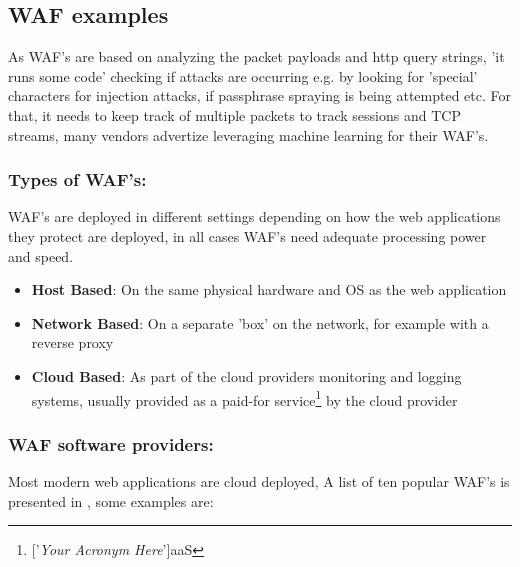 \documentclass[
	letterpaper, %
	10pt, %
	unnumberedsections, %
	twoside, %
]{APAAssignment}
\begin{document}
\subsection{WAF examples}
As WAF's are based on analyzing the packet payloads and http query strings, 'it runs some code' checking if attacks are occurring e.g. by looking for 'special' characters for injection attacks, if passphrase spraying is being attempted etc. For that, it needs to keep track of multiple packets to track sessions and TCP streams, many vendors advertize leveraging machine learning for their WAF's\cite{OpenappsecWaf}.

\subsubsection{Types of WAF's:} WAF's are deployed in different settings depending on how the web applications they protect are deployed, in all cases WAF's need adequate processing power and speed.
\begin{itemize}
	\item{\textbf{Host Based}: On the same physical hardware and OS as the web application}
	\item{\textbf{Network Based}: On a separate 'box' on the network, for example with a reverse proxy}
	\item{\textbf{Cloud Based}: As part of the cloud providers monitoring and logging systems, usually provided as a paid-for service\footnote{['\textit{Your Acronym Here}']aaS} by the cloud provider} 
\end{itemize}


\subsubsection{WAF software providers:}
Most modern web applications are cloud deployed, A list of ten popular WAF's is presented in \cite{OpenappsecWaf}, some examples are: 
\end{document}
